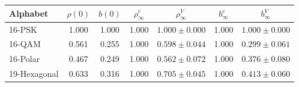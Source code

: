 \begin{tabular}{lcccccc}
\toprule
Alphabet & $\rho(0)$ & $b(0)$ & $\rho_{\infty}^{c}$ & $\rho_{\infty}^{V}$ & $b_{\infty}^{c}$ & $b_{\infty}^{V}$ \\
\midrule
16-PSK & 1.000 & 1.000 & 1.000 & $1.000 \pm 0.000$ & 1.000 & $1.000 \pm 0.000$ \\
16-QAM & 0.561 & 0.255 & 1.000 & $0.598 \pm 0.044$ & 1.000 & $0.299 \pm 0.061$ \\
16-Polar & 0.467 & 0.249 & 1.000 & $0.562 \pm 0.072$ & 1.000 & $0.376 \pm 0.080$ \\
19-Hexagonal & 0.633 & 0.316 & 1.000 & $0.705 \pm 0.045$ & 1.000 & $0.413 \pm 0.060$ \\
\bottomrule
\end{tabular}
